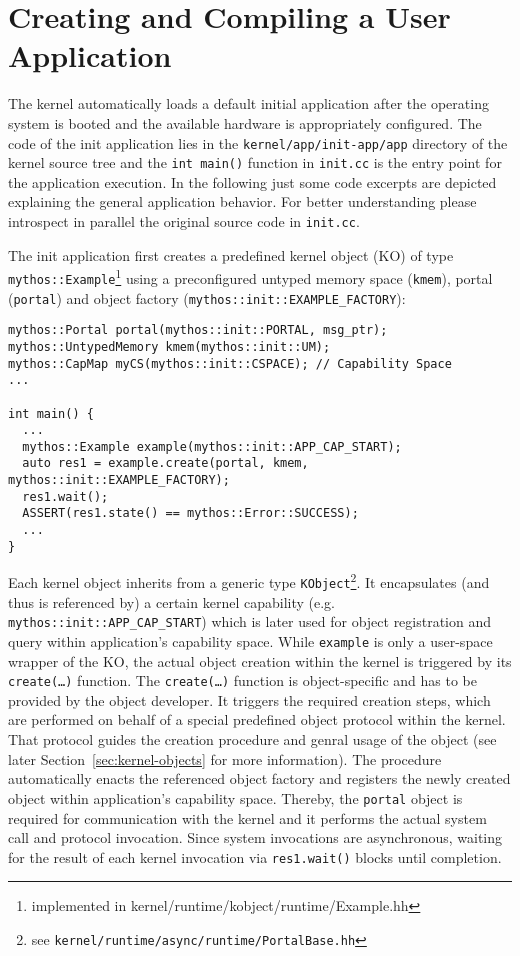 \section{Creating and Compiling a User Application}
\label{sec:init-app}

The \mythos kernel automatically loads a default initial application after the
operating system is booted and the available hardware is appropriately
configured. The code of the init application lies in the
\texttt{kernel/app/init-app/app} directory of the kernel source tree and the
\texttt{int main()} function in \texttt{init.cc} is the entry point for the
application execution. In the following just some code excerpts are depicted
explaining the general application behavior. For better understanding please
introspect in parallel the original source code in \texttt{init.cc}.

The init application first creates a predefined kernel object (KO) of type
\texttt{mythos::Example}\footnote{implemented in
kernel/runtime/kobject/runtime/Example.hh} using a preconfigured untyped memory
space (\texttt{kmem}), portal (\texttt{portal}) and object factory
(\texttt{mythos::init::EXAMPLE\_FACTORY}):

\lstset{language=c++}
\begin{lstlisting}
mythos::Portal portal(mythos::init::PORTAL, msg_ptr);
mythos::UntypedMemory kmem(mythos::init::UM);
mythos::CapMap myCS(mythos::init::CSPACE); // Capability Space
...

int main() {
  ...
  mythos::Example example(mythos::init::APP_CAP_START);
  auto res1 = example.create(portal, kmem, mythos::init::EXAMPLE_FACTORY);
  res1.wait();
  ASSERT(res1.state() == mythos::Error::SUCCESS);
  ...
}
\end{lstlisting}

\noindent Each kernel object inherits from a generic type
\texttt{KObject}\footnote{see
\texttt{kernel/runtime/async/runtime/PortalBase.hh}}.
It encapsulates (and thus is referenced by) a certain kernel capability (e.g.
\texttt{mythos::init::APP\_CAP\_START}) which is later used for object
registration and query within application's capability space. While
\texttt{example} is only a user-space wrapper of the KO, the actual object
creation within the kernel is triggered by its \texttt{create(\ldots)} function.
The \texttt{create(\ldots)} function is object-specific and has to be provided
by the object developer. It triggers the required creation steps, which are
performed on behalf of a special predefined object protocol within the kernel.
That protocol guides the creation procedure and genral usage of the object (see
later Section~\ref{sec:kernel-objects} for more information). The procedure
automatically enacts the referenced object factory and registers the newly
created object within application's capability space.
Thereby, the \texttt{portal} object is required for communication with the
kernel and it performs the actual system call and protocol invocation. Since
system invocations are asynchronous, waiting for the result of each kernel
invocation via \texttt{res1.wait()} blocks until completion.

